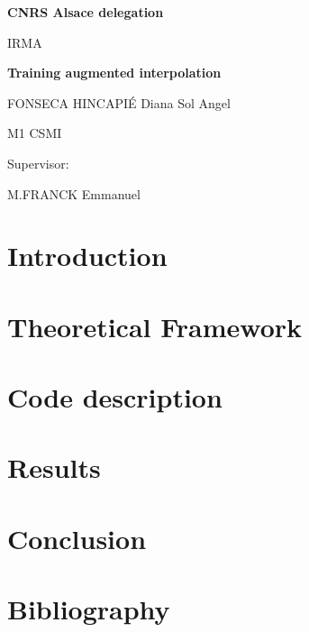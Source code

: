 \documentclass{article}
\begin{document}
\begin{titlepage}

\centering
\title{}\author{}\date{}
\centering
\vspace{5cm}
{\bfseries\LARGE CNRS Alsace delegation\par}
\vspace{3cm}
{\scshape\Large IRMA \par}
\vspace{2cm}
{\bfseries\LARGE Training augmented interpolation \par}
\vspace{1cm}
{\Large FONSECA HINCAPIÉ Diana Sol Angel\par}
\vspace{1cm}
{\Large M1 CSMI \par}
\vspace{2cm}
{\Large Supervisor: \par}
\vspace{0.5cm}
{\Large M.FRANCK Emmanuel\par}
\end{titlepage}


\maketitle
\tableofcontents
\newpage
\pagebreak




\section{Introduction}


\section{Theoretical Framework}


\section{Code description}


\section{Results}


\section{Conclusion}


\section{Bibliography}
\end{document}
